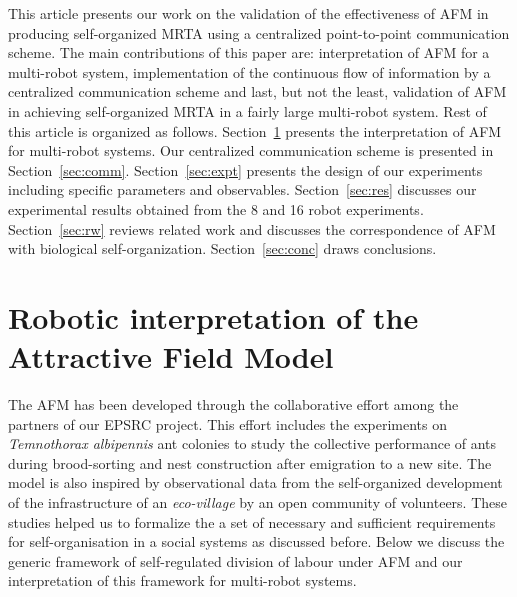 \documentclass[smallcondensed]{svjour3}
\begin{document}
This article presents our work on the validation of the effectiveness of AFM in producing self-organized MRTA using a centralized point-to-point communication scheme. The main contributions of this paper are: interpretation of AFM for a multi-robot system, implementation of the continuous flow of information by a centralized communication scheme and last, but not the least, validation of AFM in achieving self-organized MRTA in a fairly large multi-robot system. Rest of this article is organized as follows. Section~\ref{sec:afm} presents the interpretation of AFM for multi-robot systems.  Our centralized communication scheme is presented in Section~\ref{sec:comm}. Section~\ref{sec:expt} presents the design of our experiments including specific parameters and observables. Section~\ref{sec:res} discusses our experimental results obtained from the 8 and 16 robot experiments. Section~\ref{sec:rw} reviews related work and discusses the correspondence of AFM with biological self-organization. Section~\ref{sec:conc} draws conclusions.
\section{Robotic interpretation of the Attractive Field Model}
\label{sec:afm}
The AFM has been developed through the collaborative effort among the partners of our EPSRC project. This effort includes the experiments on {\em Temnothorax albipennis} ant colonies to study the collective performance of ants during brood-sorting and nest construction after emigration to a new site.  The model is also inspired by observational data from the self-organized development of the infrastructure of an {\em eco-village} by an open community of volunteers.  These studies helped us to formalize the a set of necessary and sufficient requirements for self-organisation in a social systems as discussed before. Below we discuss the generic framework of self-regulated division of labour under AFM and our interpretation of this framework for multi-robot systems.
\end{document}
